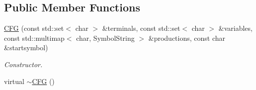 \subsection*{Public Member Functions}
\begin{DoxyCompactItemize}
\item 
\hyperlink{class_c_f_g_a74681f6f1a182d0e754e5db0e9545f5b}{C\-F\-G} (const std\-::set$<$ char $>$ \&terminals, const std\-::set$<$ char $>$ \&variables, const std\-::multimap$<$ char, Symbol\-String $>$ \&productions, const char \&startsymbol)
\begin{DoxyCompactList}\small\item\em Constructor. \end{DoxyCompactList}\item 
\hypertarget{class_c_f_g_a7a9e0feb406099038faea4c67ef31786}{virtual \hyperlink{class_c_f_g_a7a9e0feb406099038faea4c67ef31786}{$\sim$\-C\-F\-G} ()}\label{class_c_f_g_a7a9e0feb406099038faea4c67ef31786}


\end{DoxyCompactItemize}
